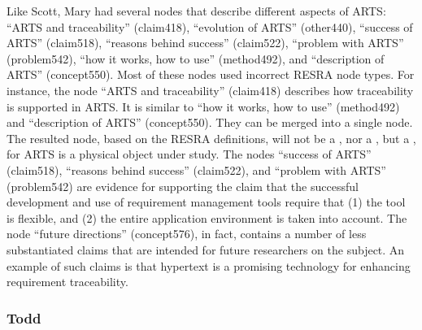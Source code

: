 Like Scott, Mary had several nodes that describe different aspects of ARTS:
``ARTS and traceability'' (claim418), ``evolution of ARTS'' (other440),
``success of ARTS'' (claim518), ``reasons behind success'' (claim522),
``problem with ARTS'' (problem542), ``how it works, how to use''
(method492), and ``description of ARTS'' (concept550). Most of these nodes
used incorrect RESRA node types. For instance, the node ``ARTS and
traceability'' (claim418) describes how traceability is supported in ARTS.
It is similar to ``how it works, how to use'' (method492) and ``description
of ARTS'' (concept550). They can be merged into a single node. The resulted
node, based on the RESRA definitions, will not be a , nor
a , but a , for ARTS is a physical
object under study.  The nodes ``success of ARTS'' (claim518), ``reasons
behind success'' (claim522), and ``problem with ARTS'' (problem542) are
evidence for supporting the claim that the successful development and use
of requirement management tools require that (1) the tool is flexible, and
(2) the entire application environment is taken into account. The node
``future directions'' (concept576), in fact, contains a number of less
substantiated claims that are intended for future researchers on the
subject. An example of such claims is that hypertext is a promising
technology for enhancing requirement traceability.


\subsubsection{Todd}

